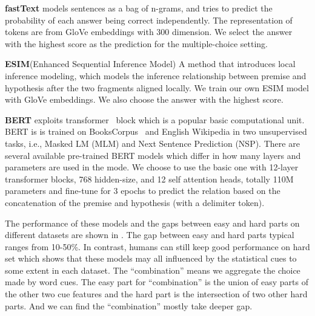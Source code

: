 \textbf{fastText} models sentences as a bag of n-grams, and tries to predict
the probability of each answer being correct independently. The representation of 
tokens are from GloVe embeddings with 300 dimension. We select the answer with the highest
score as the prediction for the multiple-choice setting.

\textbf{ESIM}(Enhanced Sequential Inference Model) 
A method that introduces local inference modeling,
which models the inference relationship between
premise and hypothesis after the two fragments aligned
locally. We train our own ESIM model
with GloVe embeddings.  We also choose the answer with the highest
score.

\textbf{BERT} exploits transformer~\cite{vaswani2017attention}
block  which is a popular basic computational unit. BERT is
is trained on BooksCorpus~\cite{zhu2015aligning} and English Wikipedia in two unsupervised
tasks, i.e., Masked LM (MLM) and Next Sentence Prediction (NSP). 
There are several available pre-trained BERT models which differ in how
many layers and parameters are used in the mode. 
We choose to use the basic one with 12-layer transformer blocks, 768 hidden-size, and 12 self attention
heads, totally 110M parameters 
and fine-tune for 3 epochs to predict
the relation based on the concatenation of the
premise and hypothesis (with a delimiter token).

The performance of these models and the gaps between easy and hard parts 
on different datasets are shown in . 
The gap between easy and hard parts typical ranges from 10-50\%. 
In contrast, humans can still keep good performance on hard set which shows that 
these models may all influenced by the statistical cues to some extent in each dataset. 
The ``combination'' means we aggregate the choice made by word cues.
The easy part for ``combination'' is the union of easy parts of the other two cue features and 
the hard part is the intersection of two other hard parts. And we can find the ``combination'' mostly take deeper 
gap.

